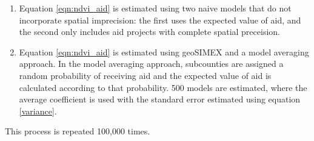 \begin{enumerate}
\item Equation \ref{eqn:ndvi_aid} is estimated using two naive models that do not incorporate spatial imprecision: the first uses the expected value of aid, and the second only includes aid projects with complete spatial preceision.
\item Equation \ref{eqn:ndvi_aid} is estimated using geoSIMEX and a model averaging approach. In the model averaging approach, subcounties are assigned a random probability of receiving aid and the expected value of aid is calculated according to that probability. 500 models are estimated, where the average coefficient is used with the standard error estimated using equation \ref{variance}.
\end{enumerate}

This process is repeated 100,000 times. 

